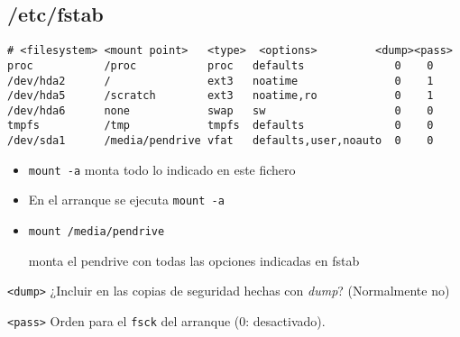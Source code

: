 \documentclass[ucs]{beamer}
\begin{document}
\begin{frame}[fragile]
  \subsection{/etc/fstab}

    {\flushleft\fontsize{7pt}{7pt}\selectfont
\begin{verbatim}
# <filesystem> <mount point>   <type>  <options>         <dump><pass>
proc           /proc           proc   defaults              0    0
/dev/hda2      /               ext3   noatime               0    1
/dev/hda5      /scratch        ext3   noatime,ro            0    1
/dev/hda6      none            swap   sw                    0    0
tmpfs          /tmp            tmpfs  defaults              0    0
/dev/sda1      /media/pendrive vfat   defaults,user,noauto  0    0

\end{verbatim}
    }

  \begin{itemize}
  \item \verb|mount -a| monta todo lo indicado en este fichero
  \item En el arranque se ejecuta \verb|mount -a|
  \item \verb|mount /media/pendrive|  

monta el pendrive con todas
  las opciones indicadas en fstab

  \end{itemize}


 \verb|<dump>|
¿Incluir en las copias de seguridad hechas con \emph{dump}? (Normalmente no)

 \verb|<pass>|
Orden para el \verb|fsck| del arranque (0: desactivado).
\end{frame}
\end{document}
